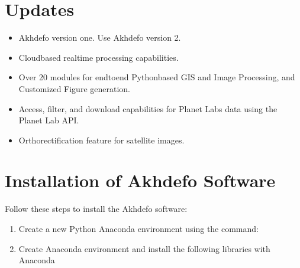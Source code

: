 \documentclass[letterpaper,10pt,english]{sphinxmanual}
\begin{document}
\section{Updates}
\label{\detokenize{README:updates}}\begin{itemize}
\item {} 
\sphinxAtStartPar
{} Akhdefo version one.  Use Akhdefo version 2.

\item {} 
\sphinxAtStartPar
{} Cloud\sphinxhyphen{}based real\sphinxhyphen{}time processing capabilities.

\item {} 
\sphinxAtStartPar
{} Over 20 modules for end\sphinxhyphen{}to\sphinxhyphen{}end Python\sphinxhyphen{}based GIS and Image Processing, and Customized Figure generation.

\item {} 
\sphinxAtStartPar
{} Access, filter, and download capabilities for Planet Labs data using the Planet Lab API.

\item {} 
\sphinxAtStartPar
{} Orthorectification feature for satellite images.

\end{itemize}


\section{Installation of Akhdefo Software}
\label{\detokenize{README:installation-of-akhdefo-software}}
\sphinxAtStartPar
Follow these steps to install the Akhdefo software:
\begin{enumerate}
%
\item {} 
\sphinxAtStartPar
Create a new Python Anaconda environment using the command:

\begin{sphinxVerbatim}[commandchars=\\\{\}]
   
\end{sphinxVerbatim}

\item {} 
\sphinxAtStartPar
Create  Anaconda environment and install the following libraries with Anaconda

\end{enumerate}
\end{document}
